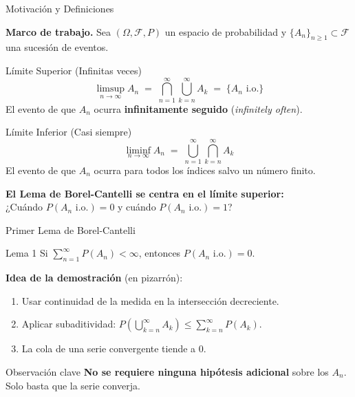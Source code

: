 \documentclass[11pt]{beamer}
\newcommand{\io}{\text{ i.o.}}
\begin{document}
\begin{frame}{Motivación y Definiciones}

  \small %
  \textbf{Marco de trabajo.} Sea $(\Omega, \mathcal{F}, P)$ un espacio de probabilidad y
  $\{A_n\}_{n \geq 1} \subset \mathcal{F}$ una sucesión de eventos.

  \vspace{-0.2cm}

  \begin{block}{Límite Superior (Infinitas veces)}
    \[
      \limsup_{n \to \infty} A_n
      \;=\; \bigcap_{n=1}^{\infty} \bigcup_{k=n}^{\infty} A_k
      \;=\; \{A_n \io\}
    \]
    El evento de que $A_n$ ocurra \textbf{infinitamente seguido} (\emph{infinitely often}).
  \end{block}

  \vspace{-0.2cm}

  \begin{block}{Límite Inferior (Casi siempre)}
    \[
      \liminf_{n \to \infty} A_n
      \;=\; \bigcup_{n=1}^{\infty} \bigcap_{k=n}^{\infty} A_k
    \]
    El evento de que $A_n$ ocurra para todos los índices salvo un número finito.
  \end{block}

  \vspace{0.1cm}
  \centering
  {\footnotesize \textbf{El Lema de Borel-Cantelli se centra en el límite superior:}\\ ¿Cuándo $P(A_n \io) = 0$ y cuándo $P(A_n \io) = 1$?}

\end{frame}
\begin{frame}{Primer Lema de Borel-Cantelli}

  \begin{block}{Lema 1}
    Si $\displaystyle\sum_{n=1}^{\infty} P(A_n) < \infty$,
    entonces $P(A_n \io) = 0$.
  \end{block}

  \bigskip
  \textbf{Idea de la demostración} (en pizarrón):

  \medskip
  \begin{enumerate}
    \item Usar continuidad de la medida en la intersección decreciente.
    \item Aplicar subaditividad:
          $P\!\left(\bigcup_{k=n}^\infty A_k\right)
          \leq \sum_{k=n}^\infty P(A_k)$.
    \item La cola de una serie convergente tiende a $0$.
  \end{enumerate}

  \bigskip
  \begin{alertblock}{Observación clave}
    \textbf{No se requiere ninguna hipótesis adicional} sobre los $A_n$.\\
    Solo basta que la serie converja.
  \end{alertblock}

\end{frame}
\end{document}
